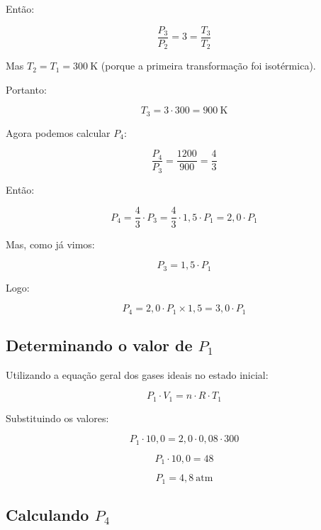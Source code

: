 \begin{flushleft}
Então:

\begin{equation}
\frac{P_3}{P_2} = 3 = \frac{T_3}{T_2}
\end{equation}

Mas $T_2 = T_1 = 300 \ \text{K}$ (porque a primeira transformação foi isotérmica).

Portanto:

\begin{equation}
T_3 = 3 \cdot 300 = 900 \ \text{K}
\end{equation}

Agora podemos calcular $P_4$:

\begin{equation}
\frac{P_4}{P_3} = \frac{1200}{900} = \frac{4}{3}
\end{equation}

Então:

\begin{equation}
P_4 = \frac{4}{3} \cdot P_3 = \frac{4}{3} \cdot 1,5 \cdot P_1 = 2,0 \cdot P_1
\end{equation}

Mas, como já vimos:

\[
P_3 = 1,5 \cdot P_1
\]

Logo:

\[
P_4 = 2,0 \cdot P_1 \times 1,5 = 3,0 \cdot P_1
\]

\subsection*{Determinando o valor de $P_1$}

Utilizando a equação geral dos gases ideais no estado inicial:

\begin{equation}
P_1 \cdot V_1 = n \cdot R \cdot T_1
\end{equation}

Substituindo os valores:

\begin{equation}
P_1 \cdot 10,0 = 2,0 \cdot 0,08 \cdot 300
\end{equation}

\begin{equation}
P_1 \cdot 10,0 = 48
\end{equation}

\begin{equation}
P_1 = 4,8 \ \text{atm}
\end{equation}

\subsection*{Calculando $P_4$}


\end{flushleft}
